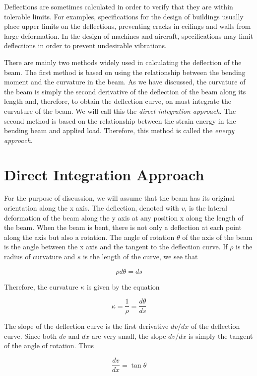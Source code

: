 \documentclass[
10pt,
a4paper,
openany,
svgnames,
]{book} %
\begin{document}
Deflections are sometimes calculated in order to verify that they are within tolerable limits. For examples, specifications for the design of buildings usually place upper limits on the deflections, preventing cracks in ceilings and walls from large deformation. In the design of machines and aircraft, specifications may limit deflections in order to prevent undesirable vibrations.

There are mainly two methods widely used in calculating the deflection of the beam. The first method is based on using the relationship between the bending moment and the curvature in the beam. As we have discussed, the curvature of the beam is simply the second derivative of the deflection of the beam along its length and, therefore, to obtain the deflection curve, on must integrate the curvature of the beam. We will call this the \emph{direct integration approach}. The second method is based on the relationship between the strain energy in the bending beam and applied load. Therefore, this method is called the \emph{energy approach}.

\section{Direct Integration Approach}

For the purpose of discussion, we will assume that the beam has its original orientation along the x axis. The deflection, denoted with $v$, is the lateral deformation of the beam along the y axis at any position x along the length of the beam.
When the beam is bent, there is not only a deflection at each point along the axis but also a rotation. The angle of rotation $\theta$ of the axis of the beam is the angle between the x axis and the tangent to the deflection curve. If $\rho$ is the radius of curvature and $s$ is the length of the curve, we see that

\[ \rho d\theta  = ds \]

Therefore, the curvature $\kappa$ is given by the equation

\begin{equation} \label{eqn: deflection curve}
  \kappa  = \frac{1}{\rho } = \frac{d\theta}{ds}
\end{equation}

The slope of the deflection curve is the first derivative $dv/dx$ of the deflection curve. Since both $dv$ and $dx$ are very small, the slope $dv/dx$ is simply the tangent of the angle of rotation. Thus

\begin{equation} \label{eqn: tan approx}
  \frac{dv}{dx} = \tan \theta
\end{equation}
\end{document}

